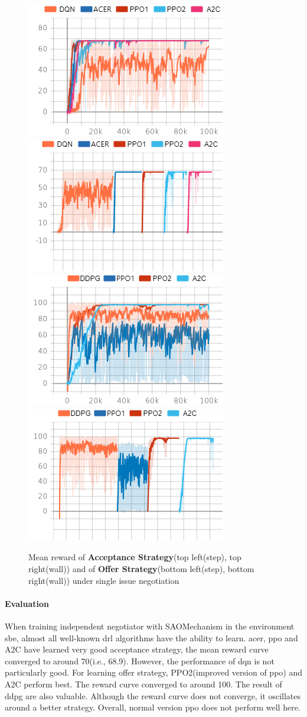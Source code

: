 \begin{figure}
    \includegraphics[width=.44\textwidth]{./images/ac_s.png}\hfill
    \includegraphics[width=.44\textwidth]{./images/ac_s_wall.png}
    \\[\smallskipamount]
    \includegraphics[width=.44\textwidth]{./images/of_s.png}\hfill
    \includegraphics[width=.44\textwidth]{./images/of_s_wall.png}
    \caption{Mean reward of \textbf{Acceptance Strategy}(top left(step), top right(wall)) and of \textbf{Offer Strategy}(bottom left(step), bottom right(wall)) under single issue negotiation}
		\label{fig:single-issue}
\end{figure}

\paragraph{Evaluation} When training independent negotiator with SAOMechanism in the environment \gls{sbe}, almost all well-known \gls{drl} algorithms have the ability to learn. \gls{acer}, \gls{ppo} and A2C have learned very good acceptance strategy, the mean reward curve converged to around 70(i.e., 68.9). However, the performance of dqn is not particularly good. For learning offer strategy, PPO2(improved version of \gls{ppo}) and A2C perform best. The reward curve converged to around 100. The result of \gls{ddpg} are also valuable. Although the reward curve does not converge, it oscillates around a better strategy. Overall, normal version \gls{ppo} does not perform well here. 

